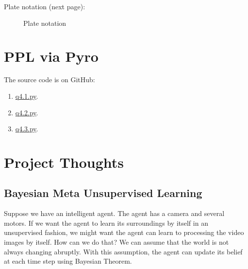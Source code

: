 Plate notation (next page):
\begin{figure}[!t]
    \centering
    \caption{Plate notation}
\end{figure}

\newpage
\section{PPL via Pyro}

The source code is on GitHub:
\begin{enumerate}
    \item \href{https://github.com/liusida/ds2/blob/main/assignment3/code/q4.1.py}{q4.1.py}.
    \item \href{https://github.com/liusida/ds2/blob/main/assignment3/code/q4.2.py}{q4.2.py}.
    \item \href{https://github.com/liusida/ds2/blob/main/assignment3/code/q4.3.py}{q4.3.py}.
\end{enumerate}

\newpage
\section{Project Thoughts}
\subsection*{Bayesian Meta Unsupervised Learning}
Suppose we have an intelligent agent.
The agent has a camera and several motors.
If we want the agent to learn its surroundings by itself in an unsupervised fashion,
we might want the agent can learn to processing the video images by itself.
How can we do that?
We can assume that the world is not always changing abruptly.
With this assumption, the agent can update its belief at each time step using Bayesian Theorem.

